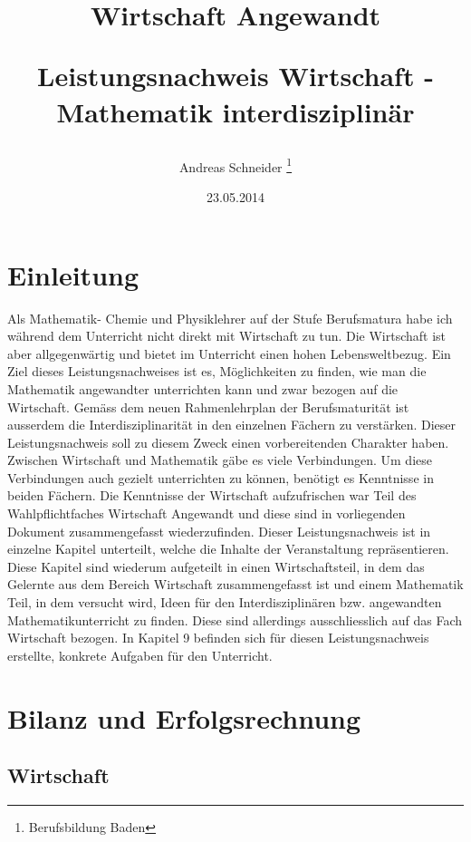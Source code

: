 \documentclass[11pt, twocolumn, a4paper]{scrartcl}
\title{Wirtschaft Angewandt\\
\begin{large}Leistungsnachweis Wirtschaft - Mathematik interdisziplin{\"a}r\end{large}}
\date{23.05.2014}
\author{Andreas Schneider \thanks{Berufsbildung Baden}}
\begin{document}
\maketitle
\begin{small}
\setcounter{tocdepth}{1}
\tableofcontents 
\end{small}

\section{Einleitung}
\label{sec:Einleitung}
Als Mathematik- Chemie und Physiklehrer auf der Stufe Berufsmatura habe ich während dem Unterricht nicht direkt mit Wirtschaft zu tun. Die Wirtschaft ist aber allgegenwärtig und bietet im Unterricht einen hohen Lebensweltbezug. Ein Ziel dieses Leistungsnachweises ist es, Möglichkeiten zu finden, wie man die Mathematik angewandter unterrichten kann und zwar bezogen auf die Wirtschaft. Gemäss dem neuen Rahmenlehrplan der Berufsmaturität ist ausserdem die Interdisziplinarität in den einzelnen Fächern zu verstärken. Dieser Leistungsnachweis soll zu diesem Zweck einen vorbereitenden Charakter haben.  Zwischen Wirtschaft und Mathematik gäbe es viele Verbindungen. Um diese Verbindungen auch gezielt unterrichten zu können, benötigt es Kenntnisse in beiden Fächern. Die Kenntnisse der Wirtschaft aufzufrischen war Teil des Wahlpflichtfaches \flqq Wirtschaft Angewandt\frqq{} und diese sind in vorliegenden Dokument zusammengefasst wiederzufinden. Dieser Leistungsnachweis ist in einzelne Kapitel unterteilt, welche die Inhalte der Veranstaltung repräsentieren. Diese Kapitel sind wiederum aufgeteilt in einen Wirtschaftsteil, in dem das Gelernte aus dem Bereich Wirtschaft zusammengefasst ist und einem Mathematik Teil, in dem versucht wird, Ideen für den Interdisziplinären bzw. angewandten Mathematikunterricht zu finden. Diese sind allerdings ausschliesslich auf das Fach Wirtschaft bezogen. In Kapitel 9 befinden sich für diesen Leistungsnachweis erstellte, konkrete Aufgaben für den Unterricht.

\section{Bilanz und Erfolgsrechnung}
\subsection{Wirtschaft}
\end{document}
